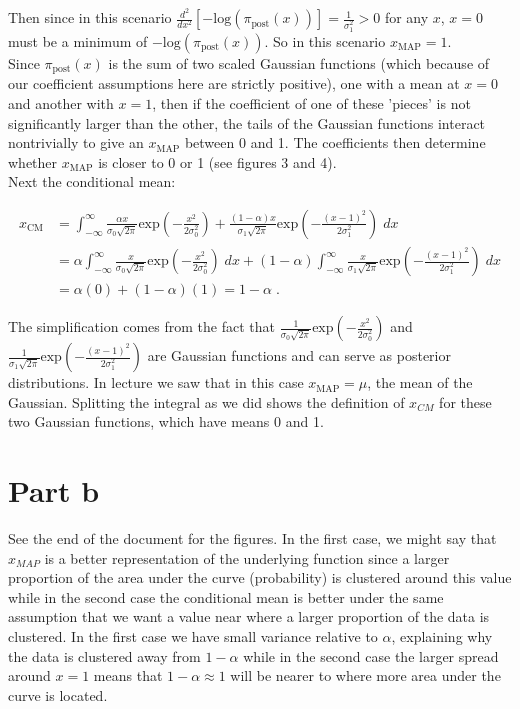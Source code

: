 \documentclass[11pt]{article}
\begin{document}
Then since in this scenario $\frac{d^2}{dx^2} \left[-\text{log}\left(\pi_{\text{post}}(x)\right) \right] = \frac{1}{\sigma_1^2} > 0$ for any $x$, $x=0$ must be a minimum of $-\text{log}\left(\pi_{\text{post}}(x)\right)$. So in this scenario $x_{\text{MAP}} = 1$. \\

Since $\pi_{\text{post}}(x)$ is the sum of two scaled Gaussian functions (which because of our coefficient assumptions here are strictly positive), one with a mean at $x=0$ and another with $x=1$, then if the coefficient of one of these 'pieces' is not significantly larger than the other, the tails of the Gaussian functions interact nontrivially to give an $x_{\text{MAP}}$ between 0 and 1. The coefficients then determine whether $x_{\text{MAP}}$ is closer to 0 or 1 (see figures 3 and 4). \\

Next the conditional mean:

\begin{align*}
x_{\text{CM}} &= \int_{-\infty}^{\infty}\frac{\alpha x}{\sigma_0\sqrt{2\pi}}\text{exp}\left(-\frac{x^2}{2\sigma_0^2}\right) + \frac{(1-\alpha)x}{\sigma_1\sqrt{2\pi}}\text{exp}\left(-\frac{(x-1)^2}{2\sigma_1^2} \right) \; dx\\
&=\alpha \int_{-\infty}^{\infty}\frac{x}{\sigma_0\sqrt{2\pi}}\text{exp}\left(-\frac{x^2}{2\sigma_0^2}\right) \; dx + (1-\alpha)\int_{-\infty}^{\infty} \frac{x}{\sigma_1\sqrt{2\pi}}\text{exp}\left(-\frac{(x-1)^2}{2\sigma_1^2} \right) \; dx\\
&= \alpha(0) + (1-\alpha)(1) = 1-\alpha \;.
\end{align*}

The simplification comes from the fact that $\frac{1}{\sigma_0\sqrt{2\pi}}\text{exp}\left(-\frac{x^2}{2\sigma_0^2}\right)$ and $\frac{1}{\sigma_1\sqrt{2\pi}}\text{exp}\left(-\frac{(x-1)^2}{2\sigma_1^2}\right)$ are Gaussian functions and can serve as posterior distributions. In lecture we saw that in this case $x_{\text{MAP}} = \mu$, the mean of the Gaussian. Splitting the integral as we did shows the definition of $x_{CM}$ for these two Gaussian functions, which have means 0 and 1. \\

\section*{Part b}

See the end of the document for the figures. In the first case, we might say that $x_{MAP}$ is a better representation of the underlying function since a larger proportion of the area under the curve (probability) is clustered around this value while in the second case the conditional mean is better under the same assumption that we want a value near where a larger proportion of the data is clustered. In the first case we have small variance relative to $\alpha$, explaining why the data is clustered away from $1-\alpha$ while in the second case the larger spread around $x=1$ means that $1-\alpha \approx 1$ will be nearer to where more area under the curve is located. \\
\end{document}
